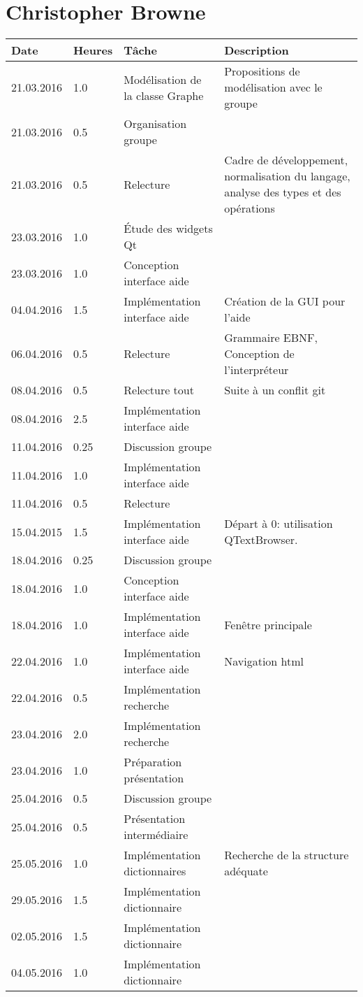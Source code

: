 \documentclass[french]{article}
\begin{document}
	\section*{Christopher Browne}
	\begin{tabular}{p{}|p{}|p{}|p{}}
		Date&Heures&Tâche&Description\\
		\hline \hline
		21.03.2016 & 1.0 & Modélisation de la classe Graphe & Propositions de modélisation avec le groupe \\
		21.03.2016 & 0.5 & Organisation groupe & \\
		21.03.2016 & 0.5 & Relecture & Cadre de développement, normalisation du langage, analyse des types et des opérations \\
		23.03.2016 & 1.0 & Étude des widgets Qt & \\
		23.03.2016 & 1.0 & Conception interface aide\\
		\hline
		04.04.2016 & 1.5 & Implémentation interface aide & Création de la GUI pour l'aide \\
		06.04.2016 & 0.5 & Relecture & Grammaire EBNF, Conception de l'interpréteur\\
		08.04.2016 & 0.5 & Relecture tout & Suite à un conflit git\\
		08.04.2016 & 2.5 & Implémentation interface aide & \\
		\hline
		11.04.2016 & 0.25 & Discussion groupe & \\
		11.04.2016 & 1.0 & Implémentation interface aide & \\
		11.04.2016 & 0.5 & Relecture & \\
		15.04.2015 & 1.5 & Implémentation interface aide & Départ à 0: utilisation QTextBrowser.\\
		\hline
		18.04.2016 & 0.25 & Discussion groupe & \\
		18.04.2016 & 1.0 & Conception interface aide & \\
		18.04.2016 & 1.0 & Implémentation interface aide & Fenêtre principale\\
		22.04.2016 & 1.0 & Implémentation interface aide & Navigation html\\
		22.04.2016 & 0.5 & Implémentation recherche & \\
		23.04.2016 & 2.0 & Implémentation recherche & \\
		23.04.2016 & 1.0 & Préparation présentation & \\
		\hline
		25.04.2016 & 0.5 & Discussion groupe & \\
		25.04.2016 & 0.5 & Présentation intermédiaire & \\
		25.05.2016 & 1.0 & Implémentation dictionnaires & Recherche de la structure adéquate\\
		29.05.2016 & 1.5 & Implémentation dictionnaire & \\
		\hline
		02.05.2016 & 1.5 & Implémentation dictionnaire & \\
		04.05.2016 & 1.0 & Implémentation dictionnaire & \\
	\end{tabular}
	
\end{document}
